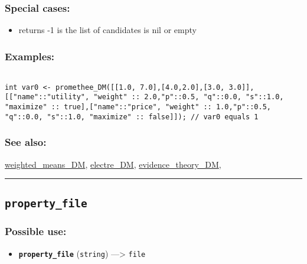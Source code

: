 \documentclass[]{book}
\providecommand{\tightlist}{%
  \setlength{\itemsep}{0pt}\setlength{\parskip}{0pt}}
\theoremstyle{definition}
\theoremstyle{definition}
\theoremstyle{definition}
\theoremstyle{remark}
\begin{document}
\subsubsection{Special cases:}\label{special-cases-114}

\begin{itemize}
\tightlist
\item
  returns -1 is the list of candidates is nil or empty
\end{itemize}

\subsubsection{Examples:}\label{examples-292}

\begin{verbatim}
 
int var0 <- promethee_DM([[1.0, 7.0],[4.0,2.0],[3.0, 3.0]], [["name"::"utility", "weight" :: 2.0,"p"::0.5, "q"::0.0, "s"::1.0, "maximize" :: true],["name"::"price", "weight" :: 1.0,"p"::0.5, "q"::0.0, "s"::1.0, "maximize" :: false]]); // var0 equals 1
\end{verbatim}

\subsubsection{See also:}\label{see-also-170}

\href{operators-s-to-z.html\#weighted_means_dm}{weighted\_means\_DM},
\href{operators-d-to-h.html\#electre_dm}{electre\_DM},
\href{operators-d-to-h.html\#evidence_theory_dm}{evidence\_theory\_DM},

\begin{center}\rule{0.5\linewidth}{\linethickness}\end{center}

\subsection{\texorpdfstring{\texttt{property\_file}}{property\_file}}\label{property_file}

\subsubsection{Possible use:}\label{possible-use-420}

\begin{itemize}
\tightlist
\item
  \textbf{\texttt{property\_file}} (\texttt{string}) ---\textgreater{}
  \texttt{file}
\end{itemize}
\end{document}

